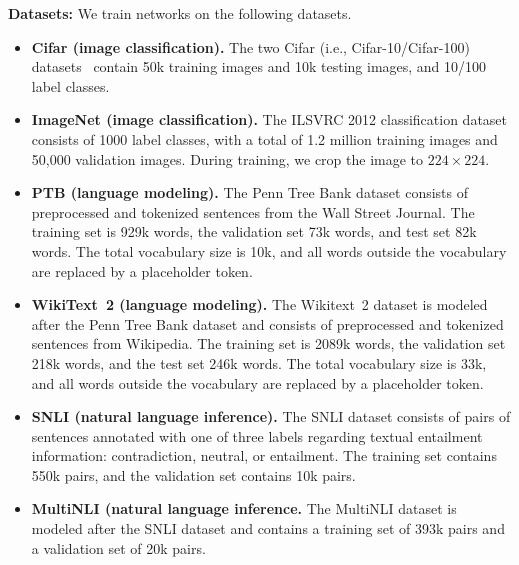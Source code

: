 \textbf{Datasets: }We train networks on the following datasets.
\begin{itemize}[noitemsep,topsep=0pt,parsep=0pt,partopsep=0pt,leftmargin=*]

\item 
\textbf{Cifar (image classification).} 
The two Cifar (i.e., Cifar-10/Cifar-100) datasets~\citep{krizhevsky2009learning} contain 50k training images and 10k testing images, and 10/100 label classes. 

\item 
\textbf{ImageNet (image classification).} 
The ILSVRC 2012 classification dataset consists of 1000 label classes, with a total of 1.2 million training images and 50,000 validation images. During training, we crop the image to $224 \times 224$.

\item 
\textbf{PTB (language modeling).} 
The Penn Tree Bank dataset consists of preprocessed and tokenized sentences from the Wall Street Journal. The training set is 929k words, the validation set 73k words, and test set 82k words. The total vocabulary size is 10k, and all words outside the vocabulary are replaced by a placeholder token.

\item 
\textbf{WikiText~2 (language modeling).} 
The Wikitext~2 dataset is modeled after the Penn Tree Bank dataset and consists of preprocessed and tokenized sentences from Wikipedia. The training set is 2089k words, the validation set 218k words, and the test set 246k words. The total vocabulary size is 33k, and all words outside the vocabulary are replaced by a placeholder token.

\item 
\textbf{SNLI (natural language inference).} 
The SNLI dataset \citep{snli:emnlp2015} consists of pairs of sentences annotated with one of three labels regarding textual entailment information: contradiction, neutral, or entailment. The training set contains 550k pairs, and the validation set contains 10k pairs.

\item 
\textbf{MultiNLI (natural language inference.} 
The MultiNLI dataset \citep{N18-1101} is modeled after the SNLI dataset and contains a training set of 393k pairs and a validation set of 20k pairs.
\end{itemize}

